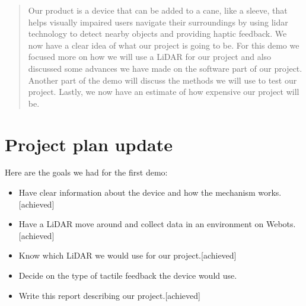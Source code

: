 \documentclass{article}
\begin{document}
 



\begin{abstract} 
Our product is a device that can be added to a cane, like a sleeve, that helps visually impaired users navigate their surroundings by using lidar technology to detect nearby objects and providing haptic feedback. We now have a clear idea of what our project is going to be. For this demo we focused more on how we will use a LiDAR for our project and also discussed some advances we have made on the software part of our project. Another part of the demo will discuss the methods we will use to test our project. Lastly, we now have an estimate of how expensive our project will be.
\end{abstract} 


\section{Project plan update} 

Here are the goals we had for the first demo:
\begin{itemize}
    \item Have clear information about the device and how the mechanism works.[achieved]
    \item Have a LiDAR move around and collect data in an environment on Webots. [achieved]
    \item Know which LiDAR we would use for our project.[achieved]
    \item Decide on the type of tactile feedback the device would use.
    \item Write this report describing our project.[achieved]

    
\end{itemize}
\end{document}
